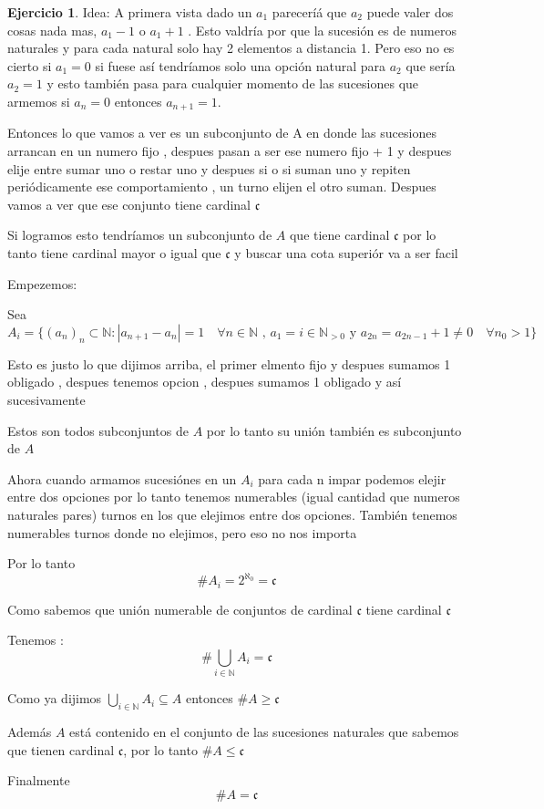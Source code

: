 \documentclass[12pt]{article}
\newcommand{\n}{\aleph_{0}}
\newcommand{\N}{\mathbb{N}}
\theoremstyle{definition}
\newtheorem{ej}{Ejercicio}
\begin{document}
\begin{ej}
	Idea: A primera vista dado un $a_1$ pareceríá que $a_2$ puede valer dos cosas nada mas, $a_1 - 1$ o $a_1 + 1$ . Esto valdría por que la sucesión es de numeros naturales y para cada natural solo hay 2 elementos a distancia 1. Pero eso no es cierto si $a_1 = 0$ si fuese así tendríamos solo una opción natural para $a_2$ que sería $a_2 = 1$ y esto también pasa para cualquier momento de las sucesiones que armemos si $a_n = 0$ entonces $a_{n+1} = 1$. 

	Entonces lo que vamos a ver es un subconjunto de A en donde las sucesiones arrancan en un numero fijo , despues pasan a ser ese numero fijo + 1 y despues elije entre sumar uno o restar uno y despues si o si suman uno y repiten periódicamente ese comportamiento , un turno elijen el otro suman. Despues vamos a ver que ese conjunto tiene cardinal $\mathfrak{c}$

	Si logramos esto tendríamos un subconjunto de $A$ que tiene cardinal $\mathfrak{c}$ por lo tanto tiene cardinal mayor o igual que $\mathfrak{c}$ y buscar una cota superiór va a ser facil

	Empezemos: 

	Sea $$A_i = \{(a_n)_n \subset \N : |a_{n+1}-a_n| = 1 \quad \forall n \in \N \text{ , } a_1 = i \in \N_{>0} \text{ y } a_{2n} = a_{2n - 1} + 1  \neq 0 \quad \forall n_0 > 1\}$$

	Esto es justo lo que dijimos arriba, el primer elmento fijo y despues sumamos 1 obligado , despues tenemos opcion , despues sumamos 1 obligado y así sucesivamente

	Estos son todos subconjuntos de $A$ por lo tanto su unión también es subconjunto de $A$

	Ahora cuando armamos sucesiónes en un $A_i$ para cada n impar podemos elejir entre dos opciones por lo tanto tenemos numerables (igual cantidad que numeros naturales pares) turnos en los que elejimos entre dos opciones. También tenemos numerables turnos donde no elejimos, pero eso no nos importa




	Por lo tanto $$\# A_i = 2^{\n} = \mathfrak{c}$$ 

	Como sabemos que unión numerable de conjuntos de cardinal $\mathfrak{c}$ tiene cardinal $\mathfrak{c}$
	
	Tenemos :$$ \# \bigcup_{i \in \N} A_i  = \mathfrak{c}$$ 

	Como ya dijimos $\bigcup_{i \in \N} A_i \subseteq A$ entonces $\# A \geq  \mathfrak{c}$

	Además $A$ está contenido en el conjunto de las sucesiones naturales que sabemos que tienen cardinal $\mathfrak{c}$, por lo tanto $\# A \leq \mathfrak{c}$

	Finalmente $$\# A = \mathfrak{c}$$
\end{ej}
\end{document}
